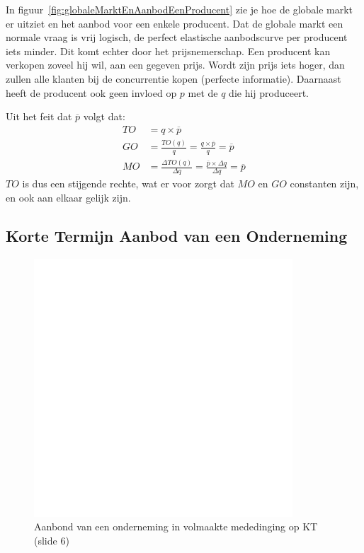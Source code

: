 In figuur~\ref{fig:globaleMarktEnAanbodEenProducent} zie je hoe de globale markt er uitziet en het aanbod voor een enkele producent. Dat de globale markt een normale vraag is vrij logisch, de perfect elastische aanbodscurve per producent iets minder. Dit komt echter door het prijsnemerschap. Een producent kan verkopen zoveel hij wil, aan een gegeven prijs. Wordt zijn prijs iets hoger, dan zullen alle klanten bij de concurrentie kopen (perfecte informatie). Daarnaast heeft de producent ook geen invloed op $p$ met de $q$ die hij produceert.

Uit het feit dat $\overline{p}$ volgt dat:
\begin{align}
   TO &= q \times \overline{p} \\
   GO &= \frac{TO(q)}{q} = \frac{q \times \overline{p}}{q} = \overline{p} \\
   MO &= \frac{\Delta TO(q)}{\Delta q} = \frac{\overline{p} \times \Delta q}{\Delta q} = \overline{p}
\end{align}
$TO$ is dus een stijgende rechte, wat er voor zorgt dat $MO$ en $GO$ constanten zijn, en ook aan elkaar gelijk zijn.

\subsection{Korte Termijn Aanbod van een Onderneming}
\begin{figure}[htbp]
   \centering
   \includegraphics[scale=0.4]{Images/white.png}
   \caption{Aanbond van een onderneming in volmaakte mededinging op KT (slide 6)}
   \label{fig:aanbodVolmaakteMededingingKT}
\end{figure}

